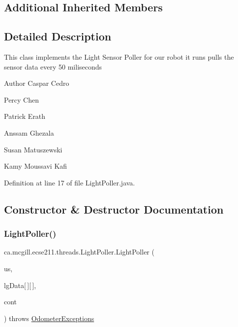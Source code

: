 \subsection*{Additional Inherited Members}


\subsection{Detailed Description}
This class implements the Light Sensor Poller for our robot it runs pulls the sensor data every 50 miliseconds

\begin{DoxyAuthor}{Author}
Caspar Cedro 

Percy Chen 

Patrick Erath 

Anssam Ghezala 

Susan Matuszewski 

Kamy Moussavi Kafi 
\end{DoxyAuthor}


Definition at line 17 of file Light\+Poller.\+java.



\subsection{Constructor \& Destructor Documentation}
\mbox{\label{classca_1_1mcgill_1_1ecse211_1_1threads_1_1_light_poller_adc07f842a1cc089195c5e47c2a0e5ee6}} 
\subsubsection{\texorpdfstring{Light\+Poller()}{LightPoller()}}
{\footnotesize\ttfamily ca.\+mcgill.\+ecse211.\+threads.\+Light\+Poller.\+Light\+Poller (\begin{DoxyParamCaption}\item[{Sample\+Provider \mbox{[}$\,$\mbox{]}}]{us,  }\item[{float}]{lg\+Data\mbox{[}$\,$\mbox{]}\mbox{[}$\,$\mbox{]},  }\item[{\hyperlink{classca_1_1mcgill_1_1ecse211_1_1threads_1_1_sensor_data}{Sensor\+Data}}]{cont }\end{DoxyParamCaption}) throws \hyperlink{classca_1_1mcgill_1_1ecse211_1_1odometer_1_1_odometer_exceptions}{Odometer\+Exceptions}}

